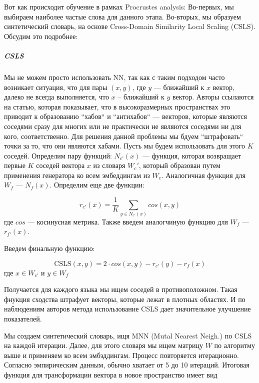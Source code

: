 \documentclass{article}
\begin{document}
    \quad

    Вот как происходит обучение в рамках Procrustes analysis:
    Во-первых, мы выбираем наиболее частые слова для данного этапа. Во-вторых, мы образуем синтетический словарь, на основе
    Cross-Domain Similarity Local Scaling (CSLS). Обсудим это подробнее: 


    \subparagraph{CSLS}

    \quad

    Мы не можем просто использовать NN, так как с таким подходом часто возникает ситуация, что для пары
    $(x, y)$, где $y$ --- ближайший к $x$ вектор, далеко не всегда выполняется, что $x$ -- ближайший к $y$ вектор.
    Авторы ссылаются на статью, которая показывает, что в высокоразмерных пространствах это приводит к образованию ``хабов``
    и ``антихабов`` --- векторов, которые являются соседями сразу для многих или не практически не являются соседями ни для кого,
    соответственно. Для решения данной проблемы мы бдуем ``штрафовать`` точки за то, что они являются хабами.
    Пусть мы будем использовать для этого $K$ соседей.
    Определим пару функций: $N_{c'}(x)$ --- функция, которая возвращает первые $K$ соседей вектора $x$ из словаря 
    $W_{c}'$, который образован путем применения генератора ко всем эмбеддингам из $W_{c}$. Аналогичная функция для $W_{f}$
    --- $N_{f}(x)$. Определим еще две функции: 

    \begin{equation}
        r_{c'}(x) = \frac{1}{K} \sum_{y \in N_{c'}(x)} cos(x, y)
    \end{equation}
    где $cos$ --- косинусная метрика. Также введем аналогчиную функцию для $W_{f}$ --- $r_{f'}(x)$.

    Введем финальную функцию: 

    \begin{equation}
        \text{CSLS}(x, y) = 2 \cdot cos(x, y) - r_{c'}(y) - r_{f}(x)
    \end{equation}
    где $x \in W_{c'}$ и $y \in W_{f}$

    Получается для каждого языка мы ищем соседей в противоположном. Такая фнукция сходства штрафует векторы, которые 
    лежат в плотных областях. И по наблюдениям авторов метода использование CSLS дает значительное улучшение показателей.
    
    \quad 

    Мы создаем синтетический словарь, ищя MNN (Mutal Nearest Neigh.) по CSLS на каждой итерации.
    Далее, для этого словаря мы ищем матрицу $W$ по алгоритму выше и применяем ко всем эмбэддингам. 
    Процесс повторяется итерационно. Согласно эмпирическим данным, обычно хватает от 5 до 10 итераций.
    Итоговая функция для трансформации вектора в новое пространство имеет вид 
\end{document}
